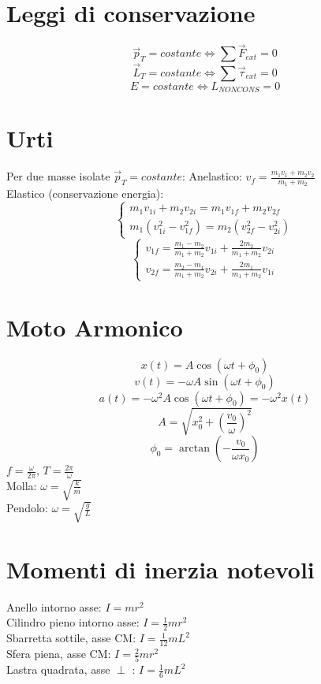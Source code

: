 \documentclass{article}
\begin{document}
\begin{small}
\begin{multicols}{3}
\section{Leggi di conservazione}
		\[ \vec p_T = costante \Leftrightarrow \sum \vec F_{ext} = 0 \]
		\[ \vec L_T = costante \Leftrightarrow \sum \vec \tau_{ext} = 0 \]
		\[ E = costante \Leftrightarrow L_{NON CONS} = 0 \]
\section{Urti}
		Per due masse isolate $ \vec p_T = costante $:
		Anelastico: $ v_f = \frac{ m_1 v_1 + m_2 v_2 }{ m_1 + m_2 } $ \\
		Elastico (conservazione energia):
		\[ \begin{cases} m_1 v_{1i} + m_2 v_{2i} = m_1 v_{1f} + m_2 v_{2f}
		\\ m_1 ( v_{1i}^2 - v_{1f}^2 ) = m_2 ( v_{2f}^2 - v_{2i}^2 ) \end{cases} \]
		\[ \begin{cases} v_{1f} = \frac{ m_1 - m_2 }{ m_1 + m_2 } v_{1i} + \frac{ 2 m_2 }{ m_1 + m_2 } v_{2i}
		\\ v_{2f} = \frac{ m_2 - m_1 }{ m_1 + m_2 } v_{2i} + \frac{ 2 m_1 }{ m_1 + m_2 } v_{1i} \end{cases} \]
\section{Moto Armonico}
		\[ x ( t ) = A \cos ( \omega t + \phi_0 ) \]
		\[ v ( t ) = - \omega A \sin ( \omega t + \phi_0 ) \]
		\[ a ( t ) = - \omega^2 A \cos ( \omega t + \phi_0 ) = - \omega^2 x( t ) \]
		\[ A = \sqrt{ x_0^2 + ( \frac{ v_0 }{ \omega } )^2 } \]
		\[ \phi_0 = \arctan ( - \frac{ v_0 }{ \omega x_0 } ) \]
		$ f = \frac{ \omega }{ 2 \pi } $, $ T = \frac{ 2 \pi }{ \omega } $ \\
		Molla: $ \omega = \sqrt{ \frac{ k }{ m } } $ \\
		Pendolo: $ \omega = \sqrt{ \frac{ g }{ L } } $
\section{Momenti di inerzia notevoli}
		Anello intorno asse: $ I = m r^2 $ \\
		Cilindro pieno intorno asse: $ I = \frac{1}{2} m r^2 $ \\
		Sbarretta sottile, asse CM: $ I = \frac{1}{ 12 } m L^2 $ \\
		Sfera piena, asse CM: $ I = \frac{ 2 }{ 5 } m r^2 $ \\
		Lastra quadrata, asse $\perp$ : $ I = \frac{1}{ 6 } m L^2 $

\end{multicols}
\end{small}
\end{document}
